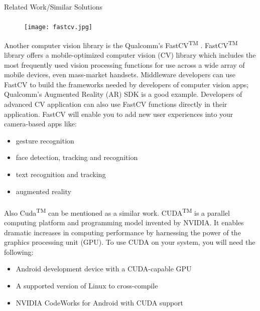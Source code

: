 \documentclass[12pt, a4paper]{article} \pagenumbering{gobble}
\begin{document}
\begin{section}{Related Work/Similar Solutions}
  \paragraph{}{
  \begin{figure}
    \centering
    \texttt{[image: fastcv.jpg]}
\end{figure}
Another computer vision library is the Qualcomm's FastCV\textsuperscript{TM} \cite{fastcv}. FastCV\textsuperscript{TM} library offers a
mobile-optimized computer vision (CV) library which includes the most frequently used vision processing functions
for use across a wide array of mobile devices, even mass-market handsets. Middleware developers can use FastCV to
build the frameworks needed by developers of computer vision apps; Qualcomm's Augmented Reality (AR) SDK is a good
example. Developers of advanced CV application can also use FastCV functions directly in their application. FastCV will
enable you to add new user experiences into your camera-based apps like:
\begin{itemize}
  \item gesture recognition
  \item face detection, tracking and recognition
  \item text recognition and tracking
  \item augmented reality
\end{itemize}

}

\paragraph{}{
Also Cuda\textsuperscript{TM} \cite{cuda} can be mentioned as a similar work. CUDA\textsuperscript{TM} is a parallel computing platform and programming model invented by
NVIDIA. It enables dramatic increases in computing performance by harnessing the power of the graphics processing unit
(GPU). To use CUDA on your system, you will need the following:
\begin{itemize}
  \item Android development device with a CUDA-capable GPU
  \item A supported version of Linux to cross-compile
  \item NVIDIA CodeWorks for Android with CUDA support
\end{itemize}
}

\end{section}

\newpage
\end{document}
